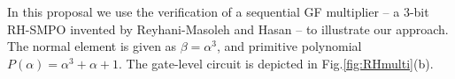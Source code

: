 % 
% 
% 
% 


In this proposal we use the verification of a sequential GF multiplier -- 
a 3-bit RH-SMPO invented by Reyhani-Masoleh and Hasan\cite{RHmulti} -- to illustrate our approach.
The normal element is given as $\beta = \alpha^3$, and primitive polynomial $P(\alpha) = \alpha^3+\alpha+1$.
The gate-level circuit is depicted in Fig.\ref{fig:RHmulti}(b).


